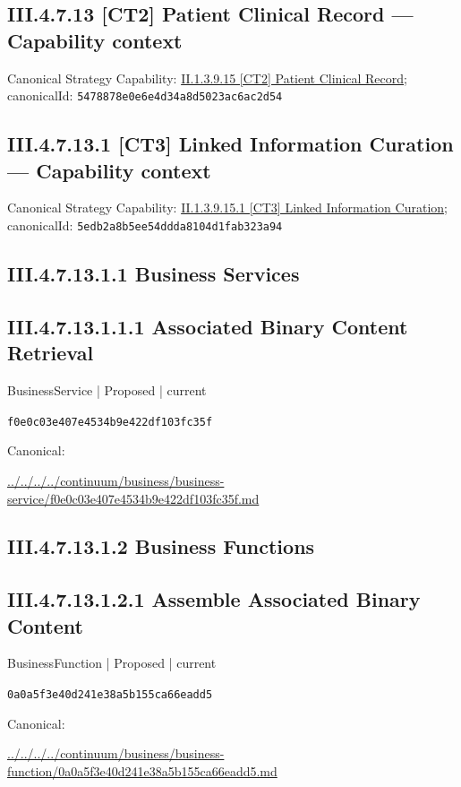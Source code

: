 \documentclass[10pt,a4paper]{article}
\begin{document}
\subsection*{III.4.7.13 [CT2] Patient Clinical Record — Capability context}
Canonical Strategy Capability: \hyperref[element-5478878e0e6e4d34a8d5023ac6ac2d54]{II.1.3.9.15 [CT2] Patient Clinical Record}; canonicalId: \texttt{5478878e0e6e4d34a8d5023ac6ac2d54}\par
\subsection*{III.4.7.13.1 [CT3] Linked Information Curation — Capability context}
Canonical Strategy Capability: \hyperref[element-5edb2a8b5ee54ddda8104d1fab323a94]{II.1.3.9.15.1 [CT3] Linked Information Curation}; canonicalId: \texttt{5edb2a8b5ee54ddda8104d1fab323a94}\par
\subsection*{III.4.7.13.1.1 Business Services}
\subsection*{III.4.7.13.1.1.1 Associated Binary Content Retrieval}
\label{element-f0e0c03e407e4534b9e422df103fc35f}
{\small BusinessService | Proposed | current}\par
\texttt{f0e0c03e407e4534b9e422df103fc35f}\par
Canonical: \par
{\footnotesize\url{../../../../continuum/business/business-service/f0e0c03e407e4534b9e422df103fc35f.md}}\par
\subsection*{III.4.7.13.1.2 Business Functions}
\subsection*{III.4.7.13.1.2.1 Assemble Associated Binary Content}
\label{element-0a0a5f3e40d241e38a5b155ca66eadd5}
{\small BusinessFunction | Proposed | current}\par
\texttt{0a0a5f3e40d241e38a5b155ca66eadd5}\par
Canonical: \par
{\footnotesize\url{../../../../continuum/business/business-function/0a0a5f3e40d241e38a5b155ca66eadd5.md}}\par
\end{document}

